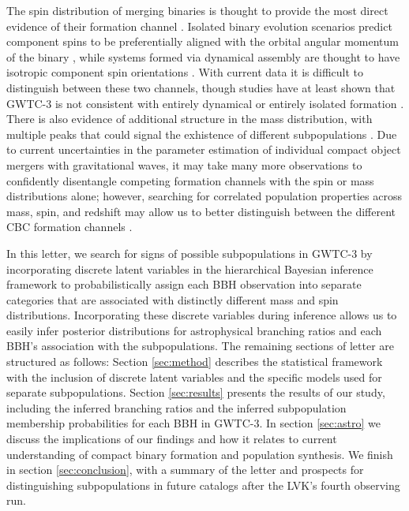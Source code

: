 The spin distribution of merging binaries is thought to provide the most direct evidence of their formation channel \citep{2017Natur.548..426F,2018ApJ...854L...9F}. Isolated binary evolution scenarios predict component spins to be preferentially aligned with the orbital angular momentum of the binary \citep{10.1051/0004-6361/201936204,10.1051/0004-6361/202039804}, while systems formed via dynamical assembly are thought to have isotropic component spin orientations \citep{10.3847/2041-8205/832/1/L2,10.1103/PhysRevD.100.043027}. With current data it is difficult to distinguish between these two channels, though studies have at least shown that GWTC-3 is not consistent with entirely dynamical or entirely isolated formation \citep{2021arXiv211103634T,2022ApJ...937L..13C,2022arXiv220902206T,2022arXiv221012834E,10.3847/2041-8213/ac86c4}. There is also evidence of additional structure in the mass distribution, with multiple peaks that could signal the exhistence of different subpopulations \citep{2021ApJ...913L..19T,2022ApJ...924..101E,2021arXiv211103634T,2022ApJ...928..155T,2022arXiv221012834E}. Due to current uncertainties in the parameter estimation of individual compact object mergers with gravitational waves, it may take many more observations to confidently disentangle competing formation channels with the spin or mass distributions alone; however, searching for correlated population properties across mass, spin, and redshift may allow us to better distinguish between the different CBC formation channels \citep{2021ApJ...912...98F,2021ApJ...922L...5C,2022ApJ...931...17V,2022ApJ...932L..19B}. 

In this letter, we search for signs of possible subpopulations in GWTC-3 by incorporating discrete latent variables in the hierarchical Bayesian inference framework to probabilistically assign each BBH observation into separate categories that are associated with distinctly different mass and spin distributions. Incorporating these discrete variables during inference allows us to easily infer posterior distributions for astrophysical branching ratios and each BBH's association with the subpopulations. The remaining sections of letter are structured as follows: Section \ref{sec:method} describes the statistical framework with the inclusion of discrete latent variables and the specific models used for separate subpopulations. Section \ref{sec:results} presents the results of our study, including the inferred branching ratios and the inferred subpopulation membership probabilities for each BBH in GWTC-3. In section \ref{sec:astro} we discuss the implications of our findings and how it relates to current understanding of compact binary formation and population synthesis. We finish in section \ref{sec:conclusion}, with a summary of the letter and prospects for distinguishing subpopulations in future catalogs after the LVK's fourth observing run. 